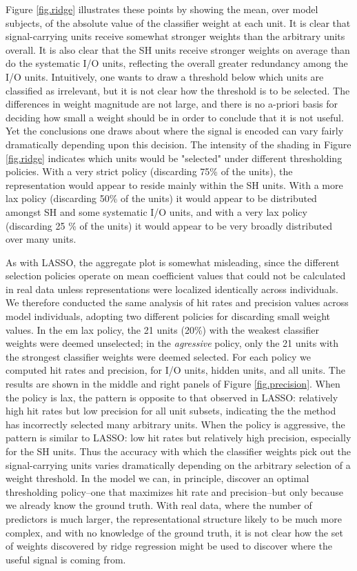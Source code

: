 Figure \ref{fig.ridge} illustrates these points by showing the mean, over model subjects, of the absolute value of the classifier weight at each unit. It is clear that signal-carrying units receive somewhat stronger weights than the arbitrary units overall. It is also clear that the SH units receive stronger weights on average than do the systematic I/O units, reflecting the overall greater redundancy among the I/O units. Intuitively, one wants to draw a threshold below which units are classified as irrelevant, but it is not clear how the threshold is to be selected. The differences in weight magnitude are not large, and there is no a-priori basis for deciding how small a weight should be in order to conclude that it is not useful. Yet the conclusions one draws about where the signal is encoded can vary fairly dramatically depending upon this decision. The intensity of the shading in Figure \ref{fig.ridge} indicates which units would be "selected" under different thresholding policies. With a very strict policy (discarding 75\% of the units), the representation would appear to reside mainly within the SH units. With a more lax policy (discarding 50\% of the units) it would appear to be distributed amongst SH and some systematic I/O units, and with a very lax policy (discarding 25 \% of the units) it would appear to be very broadly distributed over many units.

As with LASSO, the aggregate plot is somewhat misleading, since the different selection policies operate on mean coefficient values that could not be calculated in real data unless representations were localized identically across individuals. We therefore conducted the same analysis of hit rates and precision values across model individuals, adopting two different policies for discarding small weight values. In the {em lax} policy, the 21 units (20\%) with the weakest classifier weights were deemed unselected; in the {\em agressive} policy, only the 21 units with the strongest classifier weights were deemed selected. For each policy we computed hit rates and precision, for I/O units, hidden units, and all units. The results are shown in the middle and right panels of Figure \ref{fig.precision}. When the policy is lax, the pattern is opposite to that observed in LASSO: relatively high hit rates but low precision for all unit subsets, indicating the the method has incorrectly selected many arbitrary units. When the policy is aggressive, the pattern is similar to LASSO: low hit rates but relatively high precision, especially for the SH units. Thus the accuracy with which the classifier weights pick out the signal-carrying units varies dramatically depending on the arbitrary selection of a weight threshold. In the model we can, in principle, discover an optimal thresholding policy--one that maximizes hit rate and precision--but only because we already know the ground truth. With real data, where the number of predictors is much larger, the representational structure likely to be much more complex, and with no knowledge of the ground truth, it is not clear how the set of weights discovered by ridge regression might be used to discover where the useful signal is coming from.  


